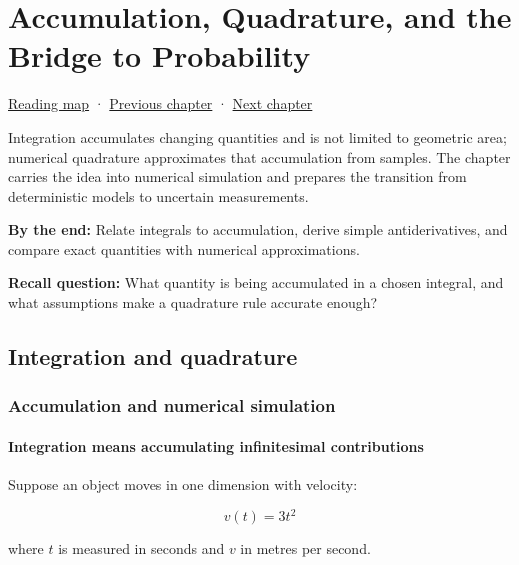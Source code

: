 \hypertarget{02-foundations-ii-ch022}{}
\chapter{Accumulation, Quadrature, and the Bridge to Probability}\label{stagechapter:02-foundations-ii-ch022}\label{02-foundations-ii-ch022-accumulation-quadrature-and-the-bridge-to-probability}

\hyperref[volume-reading-map]{Reading map} · \hyperref[02-foundations-ii-ch021-multivariable-derivatives-and-sensitivity]{Previous chapter} · \hyperref[02-foundations-ii-ch023-probability-models-and-measurement-error]{Next chapter}

Integration accumulates changing quantities and is not limited to geometric area; numerical quadrature approximates that accumulation from samples. The chapter carries the idea into numerical simulation and prepares the transition from deterministic models to uncertain measurements.

\textbf{By the end:} Relate integrals to accumulation, derive simple antiderivatives, and compare exact quantities with numerical approximations.

\textbf{Recall question:} What quantity is being accumulated in a chosen integral, and what assumptions make a quadrature rule accurate enough?

\section{Integration and quadrature}\label{02-foundations-ii-ch022-integration-and-quadrature}

\subsection{Accumulation and numerical simulation}\label{02-foundations-ii-ch022-accumulation-and-numerical-simulation}

\subsubsection{Integration means accumulating infinitesimal contributions}\label{02-foundations-ii-ch022-integration-means-accumulating-infinitesimal-contributions}

Suppose an object moves in one dimension with velocity:

\[
v(t)=3t^2
\]

where \(t\) is measured in seconds and \(v\) in metres per second.

